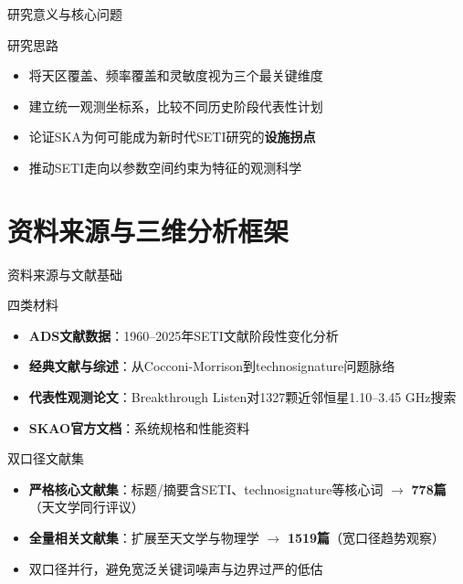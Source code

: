 \documentclass{sysupptthesis}
\begin{document}
\begin{frame}{研究意义与核心问题}

    \begin{block}{研究思路}
        \begin{itemize}
            \item 将天区覆盖、频率覆盖和灵敏度视为三个最关键维度
            \item 建立统一观测坐标系，比较不同历史阶段代表性计划
            \item 论证SKA为何可能成为新时代SETI研究的\textbf{设施拐点}
            \item 推动SETI走向以参数空间约束为特征的观测科学
        \end{itemize}
    \end{block}
\end{frame}

\section{资料来源与三维分析框架}

\begin{frame}{资料来源与文献基础}
    \begin{block}{四类材料}
        \begin{itemize}
            \item \textbf{ADS文献数据}：1960--2025年SETI文献阶段性变化分析
            \item \textbf{经典文献与综述}：从Cocconi-Morrison到technosignature问题脉络
            \item \textbf{代表性观测论文}：Breakthrough Listen对1327颗近邻恒星1.10--3.45 GHz搜索
            \item \textbf{SKAO官方文档}：系统规格和性能资料
        \end{itemize}
    \end{block}

    \begin{block}{双口径文献集}
        \begin{itemize}
            \item \textbf{严格核心文献集}：标题/摘要含SETI、technosignature等核心词 $\rightarrow$ \textbf{778篇}（天文学同行评议）
            \item \textbf{全量相关文献集}：扩展至天文学与物理学 $\rightarrow$ \textbf{1519篇}（宽口径趋势观察）
            \item 双口径并行，避免宽泛关键词噪声与边界过严的低估
        \end{itemize}
    \end{block}
\end{frame}
\end{document}
